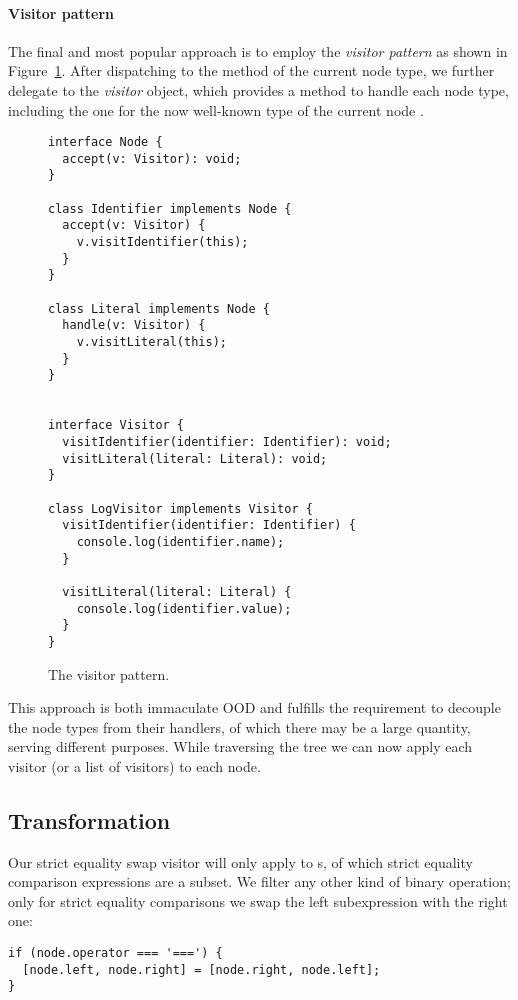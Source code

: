 \paragraph{Visitor pattern}
The final and most popular approach is
to employ the \textit{visitor pattern}
as shown in Figure~\ref{fig:TreeNodeVisitorPattern}.
\autocite{DesignPatterns}
After dispatching to the  method
of the current node type,
we further delegate to the \textit{visitor} object,
which provides a method to handle each node type,
including the one for the now well-known type
of the current node .

\begin{figure}
  \begin{verbatim}
interface Node {
  accept(v: Visitor): void;
}

class Identifier implements Node {
  accept(v: Visitor) {
    v.visitIdentifier(this);
  }
}

class Literal implements Node {
  handle(v: Visitor) {
    v.visitLiteral(this);
  }
}


interface Visitor {
  visitIdentifier(identifier: Identifier): void;
  visitLiteral(literal: Literal): void;
}

class LogVisitor implements Visitor {
  visitIdentifier(identifier: Identifier) {
    console.log(identifier.name);
  }

  visitLiteral(literal: Literal) {
    console.log(identifier.value);
  }
}
  \end{verbatim}
  \caption{
    The visitor pattern.
  }\label{fig:TreeNodeVisitorPattern}
\end{figure}

This approach is both immaculate OOD and
fulfills the requirement to
decouple the node types from their handlers,
of which there may be a large quantity,
serving different purposes.
While traversing the tree we can now apply each visitor
(or a list of visitors) to each node.

\subsection{Transformation}
Our strict equality swap visitor will only apply to s,
of which strict equality comparison expressions are a subset.
We filter any other kind of binary operation;
only for strict equality comparisons we swap the
left subexpression with the right one:
\begin{verbatim}
if (node.operator === '===') {
  [node.left, node.right] = [node.right, node.left];
}
\end{verbatim}

